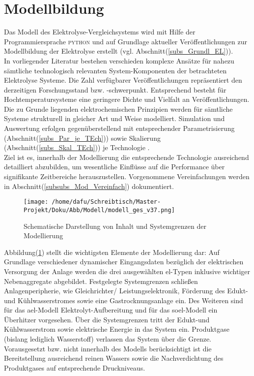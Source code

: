 \documentclass[onecolumn,10pt,titlepage]{article}
\begin{document}
\newpage
\section{Modellbildung}

Das Modell des Elektrolyse-Vergleichsystems wird mit Hilfe der Programmiersprache \textsc{python} und auf Grundlage aktueller Veröffentlichungen zur Modellbildung der Elektrolyse erstellt (vgl. Abschnitt(\ref{subs_Grundl_EL})).\\
In vorliegender Literatur bestehen verschieden komplexe Ansätze für nahezu sämtliche technologisch relevanten System-Komponenten der betrachteten Elektrolyse Systeme. Die Zahl verfügbarer Veröffentlichungen repräsentiert den derzeitigen Forschungsstand bzw. -schwerpunkt. Entsprechend besteht für Hochtemperatursysteme eine geringere Dichte und Vielfalt an Veröffentlichungen.\\
Die zu Grunde liegenden elektrochemischen Prinzipien werden für sämtliche Systeme strukturell in gleicher Art und Weise modelliert. Simulation und Auswertung erfolgen gegenüberstellend mit entsprechender Parametrisierung (Abschnitt(\ref{subs_Par_je_TEch})) sowie Skalierung (Abschnitt(\ref{subs_Skal_TEch})) je Technologie .\\
Ziel ist es, innerhalb der Modellierung die entsprechende Technologie ausreichend detailliert abzubilden, um wesentliche Einflüsse auf die Performance über signifikante Zeitbereiche %
herauszustellen. %
Vorgenommene Vereinfachungen werden in Abschnitt(\ref{subsubs_Mod_Vereinfach}) dokumentiert.
\begin{figure}[H]

	\centering
	\texttt{[image: /home/dafu/Schreibtisch/Master-Projekt/Doku/Abb/Modell/modell\_ges\_v37.png]}
	\caption[Inhalt und Systemgrenzen der Modellierung]{Schematische Darstellung von Inhalt und Systemgrenzen der Modellierung}
	\label{fig:Mod_Zielsetz}
\end{figure}
Abbildung(\ref{fig:Mod_Zielsetz}) stellt die wichtigsten Elemente der Modellierung dar:
Auf Grundlage verschiedener dynamischer Eingangsdaten bezüglich der elektrischen Versorgung der Anlage werden die drei ausgewählten \gls{el}-Typen inklusive wichtiger Nebenaggregate abgebildet. Festgelegte Systemgrenzen schließen Anlagenperipherie, wie Gleichrichter/ Leistungselektronik, Förderung des Edukt- und Kühlwasserstromes sowie eine Gastrocknungsanlage ein. Des Weiteren sind für das \gls{ael}-Modell Elektrolyt-Aufbereitung und für das \gls{soel}-Modell ein Überhitzer vorgesehen. Über die Systemgrenzen tritt der Edukt-und Kühlwasserstrom sowie elektrische Energie in das System ein. Produktgase (bislang lediglich Wasserstoff) verlassen das System über die Grenze. Vorausgesetzt bzw. nicht innerhalb des Modells berücksichtigt ist die Bereitstellung ausreichend reinen Wassers sowie die Nachverdichtung des Produktgases auf entsprechende Druckniveaus.
\end{document}
